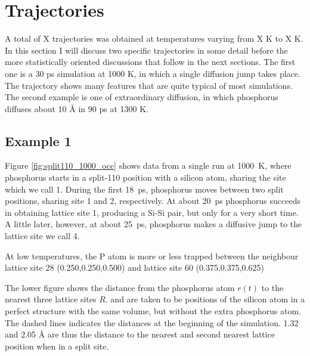 \documentclass[11pt,bibliography=totoc,index=totoc]{scrbook}   %
\begin{document}
\section{Trajectories}



A total of X trajectories was obtained at temperatures varying from X K to X K. 
In this section I will discuss two specific trajectories in some detail before the more statistically oriented discussions that follow in the next sections.
The first one is a 30 ps simulation at 1000 K, in which a single diffusion jump takes place. 
The trajectory shows many features that are quite typical of most simulations.
The second example is one of extraordinary diffusion, in which phosphorus diffuses about 10 Å in 90 ps at 1300 K.

\subsection{Example 1}

Figure \ref{fig:split110_1000_occ} shows data from a single run at 1000~K,
where phosphorus starts in a split-110 position with a silicon atom, sharing the site which we call 1. During the first 18~ps, phosphorus moves between two split positions, sharing site 1 and 2, respectively. At about 20~ps phosphorus succeeds in obtaining lattice site 1, producing a Si-Si pair, but only for a very short time. A little later, however, at about 25~ps, phosphorus makes a diffusive jump to the lattice site we call 4. 

At low temperatures, the P atom is more or less trapped between the neighbour lattice site 28 (0.250,0.250,0.500) and lattice site 60 (0.375,0.375,0.625)

  The lower figure shows the distance from the phosphorus atom $r(t)$ to the nearest three lattice sites $R$.
  and are taken to be positions of the silicon atom in a perfect structure with the same volume, but without the extra phosphorus atom.
  The dashed lines indicates the distances at the beginning of the simulation. 1.32 and 2.05 Å are thus the distance to the nearest
  and second nearest lattice position when in a split site.
\end{document}

